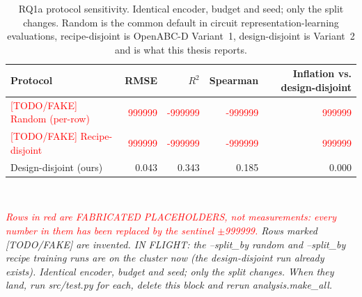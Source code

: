 \begin{table}[htbp]
\centering
\caption{RQ1a protocol sensitivity. Identical encoder, budget and seed; only the split changes. Random is the common default in circuit representation-learning evaluations, recipe-disjoint is OpenABC-D Variant~1, design-disjoint is Variant~2 and is what this thesis reports.}
\label{tab:rq1a_protocol}
\small
\begin{tabular}{lrrrr}
\toprule
\textbf{Protocol} & \textbf{RMSE} & \textbf{$R^2$} & \textbf{Spearman} & \textbf{Inflation vs. design-disjoint} \\
\midrule
\textcolor{red}{{[TODO/FAKE] Random (per-row)}} & \textcolor{red}{999999} & \textcolor{red}{-999999} & \textcolor{red}{-999999} & \textcolor{red}{999999} \\
\textcolor{red}{{[TODO/FAKE] Recipe-disjoint}} & \textcolor{red}{999999} & \textcolor{red}{-999999} & \textcolor{red}{-999999} & \textcolor{red}{999999} \\
Design-disjoint (ours) & 0.043 & 0.343 & 0.185 & 0.000 \\
\bottomrule
\end{tabular}
\\[4pt]\begin{minipage}{\linewidth}\footnotesize\emph{\textcolor{red}{Rows in red are FABRICATED PLACEHOLDERS, not measurements: every number in them has been replaced by the sentinel $\pm$999999.} Rows marked [TODO/FAKE] are invented. IN FLIGHT: the --split\_by random and --split\_by recipe training runs are on the cluster now (the design-disjoint run already exists). Identical encoder, budget and seed; only the split changes. When they land, run src/test.py for each, delete this block and rerun analysis.make\_all.}\end{minipage}
\end{table}
